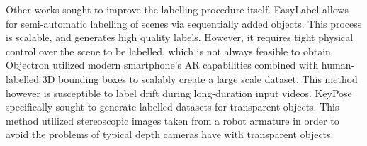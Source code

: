 Other works sought to improve the labelling procedure itself. EasyLabel \cite{suchi2019easylabel} allows for semi-automatic labelling of scenes via sequentially added objects.  This process is scalable, and generates high quality labels. However, it requires tight physical control over the scene to be labelled, which is not always feasible to obtain. Objectron \cite{ahmadyan2021objectron} utilized modern smartphone's AR capabilities combined with human-labelled 3D bounding boxes to scalably create a large scale dataset. This method however is susceptible to label drift during long-duration input videos. KeyPose \cite{liu2020keypose} specifically sought to generate labelled datasets for transparent objects. This method utilized stereoscopic images taken from a robot armature in order to avoid the problems of typical depth cameras have with transparent objects.
